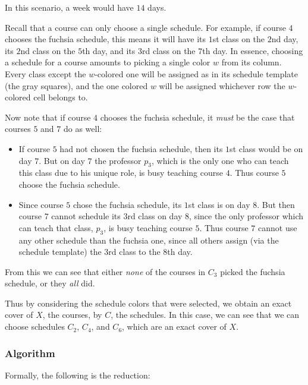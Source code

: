 In this scenario, a week would have $14$ days.

Recall that a course can only choose a single schedule. For example, if course $4$ chooses the {\color{Fuchsia}fuchsia} schedule, this means it will have its $1$st class on the $2$nd day, its $2$nd class on the $5$th day, and its $3$rd class on the $7$th day. In essence, choosing a schedule for a course amounts to picking a single color $w$ from its column. Every class except the $w$-colored one will be assigned as in its schedule template (the {\color{gray}gray} squares), and the one colored $w$ will be assigned whichever row the $w$-colored cell belongs to.


Now note that if course $4$ chooses the {\color{Fuchsia}fuchsia} schedule, it \emph{must} be the case that courses $5$ and $7$ do as well:
\begin{itemize}
\item If course $5$ had not chosen the {\color{Fuchsia}fuchsia} schedule, then its $1$st class would be on day $7$. But on day $7$ the professor $p_3$, which is the only one who can teach this class due to his unique role, is busy teaching course $4$. Thus course $5$ choose the {\color{Fuchsia}fuchsia} schedule.
\item Since course $5$ chose the {\color{Fuchsia}fuchsia} schedule, its $1$st class is on day $8$. But then course $7$ cannot schedule its $3$rd class on day $8$, since the only professor which can teach that class, $p_3$, is busy teaching course $5$. Thus course $7$ cannot use any other schedule than the {\color{Fuchsia}fuchsia} one, since all others assign (via the schedule template) the $3$rd class to the $8$th day.
\end{itemize}

From this we can see that either \emph{none} of the courses in {\color{Fuchsia}$C_3$} picked the {\color{Fuchsia}fuchsia} schedule, or they \emph{all} did.

Thus by considering the schedule colors that were selected, we obtain an exact cover of $X$, the courses, by $C$, the schedules. In this case, we can see that we can choose schedules {\color{NavyBlue} $C_2$}, {\color{ForestGreen} $C_4$}, and {\color{Tan} $C_6$}, which are an exact cover of $X$.






\newpage
\subsubsection{Algorithm}
Formally, the following is the reduction:

